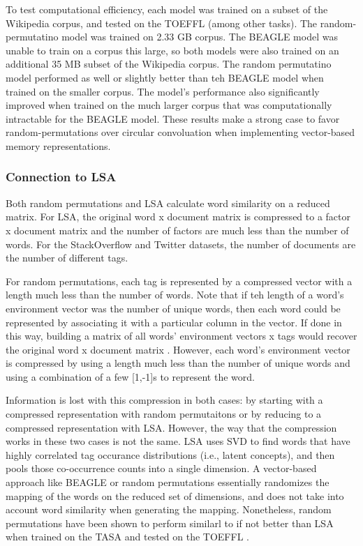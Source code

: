 \documentclass[man,floatsintext]{apa6}
\begin{document}
To test computational efficiency, each model was trained on a subset of the Wikipedia corpus, and tested on the TOEFFL (among other tasks).
The random-permutatino model was trained on \num{2.33} GB corpus.
The BEAGLE model was unable to train on a corpus this large, so both models were also trained on an additional \num{35} MB subset of the Wikipedia corpus.
The random permutatino model performed as well or slightly better than teh BEAGLE model when trained on the smaller corpus.
The model's performance also significantly improved when trained on the much larger corpus that was computationally intractable for the BEAGLE model.
These results make a strong case to favor random-permutations over circular convoluation when implementing vector-based memory representations.

\subsubsection{Connection to LSA}

Both random permutations and LSA calculate word similarity on a reduced matrix.
For LSA, the original word x document matrix is compressed to a factor x document matrix and the number of factors are much less than the number of words.
For the StackOverflow and Twitter datasets, the number of documents are the number of different tags.

For random permutations, each tag is represented by a compressed vector with a length much less than the number of words.
Note that if teh length of a word's environment vector was the number of unique words, then each word could be represented by associating it with a particular column in the vector.
If done in this way, building a matrix of all words' environment vectors x tags would recover the original word x document matrix \parencite{Kanerva2000}.
However, each word's environment vector is compressed by using a length much less than the number of unique words and using a combination of a few [1,-1]s to represent the word.

Information is lost with this compression in both cases: by starting with a compressed representation with random permutaitons or by reducing to a compressed representation with LSA.
However, the way that the compression works in these two cases is not the same.
LSA uses SVD to find words that have highly correlated tag occurance distributions (i.e., latent concepts), and then pools those co-occurrence counts into a single dimension.
A vector-based approach like BEAGLE or random permutations essentially randomizes the mapping of the words on the reduced set of dimensions, and does not take into account word similarity when generating the mapping.
Nonetheless, random permutations have been shown to perform similarl to if not better than LSA when trained on the TASA and tested on the TOEFFL \parencites{Sahlgren2008,Jones2007}.
\end{document}
